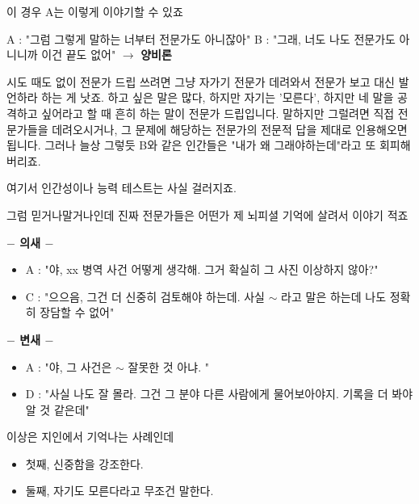 이 경우 A는 이렇게 이야기할 수 있죠
\vspace{5mm}

A : "그럼 그렇게 말하는 너부터 전문가도 아니잖아"
B : "그래, 너도 나도 전문가도 아니니까 이건 끝도 없어" $\rightarrow$ \textbf{양비론}
\vspace{5mm}

시도 때도 없이 전문가 드립 쓰려면 그냥 자가기 전문가 데려와서 전문가 보고 대신 발언하라 하는 게 낫죠.
하고 싶은 말은 많다, 하지만 자기는 '모른다', 하지만 네 말을 공격하고 싶어라고 할 때 흔히 하는 말이 전문가 드립입니다.
말하지만 그럴려면 직접 전문가들을 데려오시거나, 그 문제에 해당하는 전문가의 전문적 답을 제대로 인용해오면 됩니다.
그러나 늘상 그렇듯 B와 같은 인간들은 "내가 왜 그래야하는데"라고 또 회피해버리죠.
\vspace{5mm}

여기서 인간성이나 능력 테스트는 사실 걸러지죠.
\vspace{5mm}

그럼 믿거나말거나인데 진짜 전문가들은 어떤가 제 뇌피셜 기억에 살려서 이야기 적죠
\vspace{5mm}

\textbf{$-$ 의새 $-$}
\vspace{5mm}
\begin{itemize}
    \item[] A : "야, xx 병역 사건 어떻게 생각해. 그거 확실히 그 사진 이상하지 않아?"
    \item[] C : "으으음, 그건 더 신중히 검토해야 하는데. 사실 $\sim$ 라고 말은 하는데 나도 정확히 장담할 수 없어"
\end{itemize}
\vspace{5mm}

\textbf{$-$ 변새 $-$}
\vspace{5mm}
\begin{itemize}
    \item[] A : "야, 그 사건은 $\sim$ 잘못한 것 아냐. "
    \item[] D : "사실 나도 잘 몰라. 그건 그 분야 다른 사람에게 물어보아야지. 기록을 더 봐야 알 것 같은데"
\end{itemize}
\vspace{5mm}

이상은 지인에서 기억나는 사례인데
\vspace{5mm}
\begin{itemize}
    \item 첫째, 신중함을 강조한다.
    \item 둘째, 자기도 모른다라고 무조건 말한다.
\end{itemize}
\vspace{5mm}

